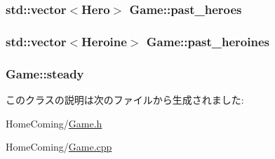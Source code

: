 \hypertarget{class_game_aca4c6b3b301b373c79cfdc83965a8ff0}{
\subsubsection[{past\-\_\-heroes}]{\setlength{\rightskip}{0pt plus 5cm}std\-::vector$<${\bf Hero}$>$ {\bf Game\-::past\-\_\-heroes}}}\label{class_game_aca4c6b3b301b373c79cfdc83965a8ff0}
\hypertarget{class_game_a5e0a401f6198f1e917a873b527643210}{
\subsubsection[{past\-\_\-heroines}]{\setlength{\rightskip}{0pt plus 5cm}std\-::vector$<${\bf Heroine}$>$ {\bf Game\-::past\-\_\-heroines}}}\label{class_game_a5e0a401f6198f1e917a873b527643210}
\hypertarget{class_game_af7003a797940ce5edce170e7092529e0}{
\subsubsection[{steady}]{ {\bf Game\-::steady}}}\label{class_game_af7003a797940ce5edce170e7092529e0}


このクラスの説明は次のファイルから生成されました\-:\begin{DoxyCompactItemize}
\item 
Home\-Coming/\hyperlink{_game_8h}{Game.\-h}\item 
Home\-Coming/\hyperlink{_game_8cpp}{Game.\-cpp}\end{DoxyCompactItemize}
